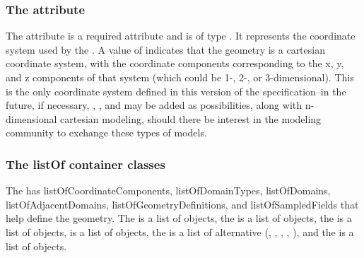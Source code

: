 \subsubsection{The \fixttspace{} attribute}
The  attribute is a required attribute and is of type . It represents the coordinate system used by the \Geometry.  A value of   indicates that the geometry is a cartesian coordinate system, with the coordinate components corresponding to the x, y, and z components of that system (which could be 1-, 2-, or 3-dimensional).  This is the only coordinate system defined in this version of the specification--in the future, if necessary, , , and  may be added as possibilities, along with n-dimensional cartesian modeling, should there be interest in the modeling community to exchange these types of models.


\subsubsection{The listOf container classes}
The \Geometry has listOfCoordinateComponents, listOfDomainTypes, listOfDomains, listOfAdjacentDomains, listOfGeometryDefinitions, and listOfSampledFields that help define the geometry.  The \ListOfCoordinateComponents is a list of \CoordinateComponent objects, the \ListOfDomainTypes is a list of \DomainType objects, the \ListOfDomains is a list of \Domain objects, \ListOfAdjacentDomains is a list of \AdjacentDomains objects, the \ListOfGeometryDefinitions is a list of alternative \GeometryDefinitions (\ParametricGeometry, \CSGeometry, \SampledFieldGeometry, \AnalyticGeometry, ), and the \ListOfSampledFields is a list of \SampledField objects.  

